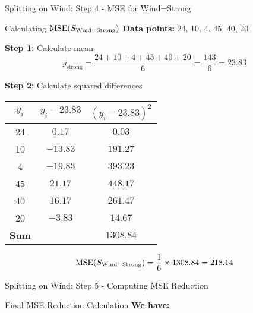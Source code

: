 \documentclass[usenames,dvipsnames]{beamer}
\begin{document}
\begin{frame}{Splitting on Wind: Step 4 - MSE for Wind=Strong}
\small
\begin{examplebox}{Calculating $\operatorname{MSE}(S_{\text{Wind=Strong}})$}
\textbf{Data points:} 24, 10, 4, 45, 40, 20

\pause
\textbf{Step 1:} Calculate mean
\[
\bar{y}_{\text{strong}} = \frac{24 + 10 + 4 + 45 + 40 + 20}{6} = \frac{143}{6} = 23.83
\]

\pause
\textbf{Step 2:} Calculate squared differences
\scriptsize
\begin{center}
\begin{tabular}{|c|c|c|}
\hline
$y_i$ & $y_i - 23.83$ & $(y_i - 23.83)^2$ \\ \hline
24 & $0.17$ & $0.03$ \\
10 & $-13.83$ & $191.27$ \\
4 & $-19.83$ & $393.23$ \\
45 & $21.17$ & $448.17$ \\
40 & $16.17$ & $261.47$ \\
20 & $-3.83$ & $14.67$ \\ \hline
\textbf{Sum} & & $\mathbf{1308.84}$ \\
\hline
\end{tabular}    
\end{center}

\pause
\[
\operatorname{MSE}(S_{\text{Wind=Strong}}) = \frac{1}{6} \times 1308.84 = 218.14
\]
\end{examplebox}
\end{frame}

\begin{frame}{Splitting on Wind: Step 5 - Computing MSE Reduction}
\scriptsize
\begin{examplebox}{Final MSE Reduction Calculation}
\textbf{We have:}

\end{examplebox}
\end{frame}
\end{document}
